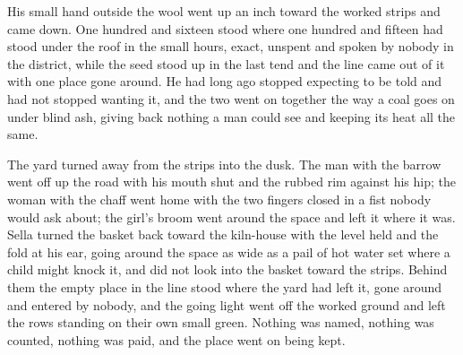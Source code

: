 His small hand outside the wool went up an inch toward the worked strips and came down. One hundred and sixteen stood where one hundred and fifteen had stood under the roof in the small hours, exact, unspent and spoken by nobody in the district, while the seed stood up in the last tend and the line came out of it with one place gone around. He had long ago stopped expecting to be told and had not stopped wanting it, and the two went on together the way a coal goes on under blind ash, giving back nothing a man could see and keeping its heat all the same.

The yard turned away from the strips into the dusk. The man with the barrow went off up the road with his mouth shut and the rubbed rim against his hip; the woman with the chaff went home with the two fingers closed in a fist nobody would ask about; the girl's broom went around the space and left it where it was. Sella turned the basket back toward the kiln-house with the level held and the fold at his ear, going around the space as wide as a pail of hot water set where a child might knock it, and did not look into the basket toward the strips. Behind them the empty place in the line stood where the yard had left it, gone around and entered by nobody, and the going light went off the worked ground and left the rows standing on their own small green. Nothing was named, nothing was counted, nothing was paid, and the place went on being kept.
